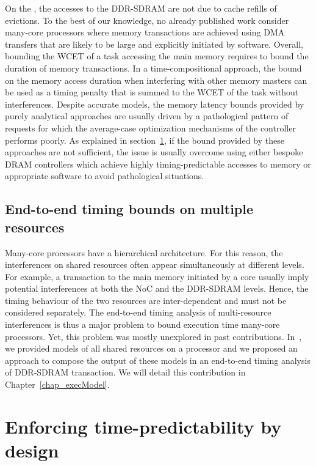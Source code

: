 \documentclass[main.tex]{subfiles}
\begin{document}
On the \mppalong, the accesses to the DDR-SDRAM are not due to cache refills of
evictions. To the best of our knowledge, no already published work consider
many-core processors where memory transactions are achieved using DMA transfers
that are likely to be large and explicitly initiated by software.  Overall,
bounding the WCET of a task accessing the main memory requires to bound the
duration of memory transactions. In a time-compositional approach, the bound on
the memory access duration when interfering with other memory masters can be
used as a timing penalty that is summed to the WCET of the task without
interferences. Despite accurate models, the memory latency bounds provided by
purely analytical approaches are usually driven by a pathological pattern of
requests for which the average-case optimization mechanisms of the controller
performs poorly. As explained in
section~\ref{sec_stateOfTheArt_predictableDesign}, if the bound provided by
these approaches are not sufficient, the issue is usually overcome using either
bespoke DRAM controllers which achieve highly timing-predictable accesses to
memory or appropriate software to avoid pathological situations.


\subsection{End-to-end timing bounds on multiple resources}
Many-core processors have a hierarchical architecture. For this reason, the
interferences on shared resources often appear simultaneously at different
levels. For example, a transaction to the main memory initiated by a core
usually imply potential interferences at both the NoC and the DDR-SDRAM levels.
Hence, the timing behaviour of the two resources are inter-dependent and must
not be considered separately. The end-to-end timing analysis of multi-resource
interferences is thus a major problem to bound execution time many-core
processors. Yet, this problem was mostly unexplored in past contributions.
In~\cite{Perret16}, we provided models of all shared resources on a \mppalong
processor and we proposed an approach to compose the output of these models in
an end-to-end timing analysis of DDR-SDRAM transaction. We will detail this
contribution in Chapter~\ref{chap_execModel}.


\section{Enforcing time-predictability by design}
\label{sec_stateOfTheArt_predictableDesign}
\end{document}
